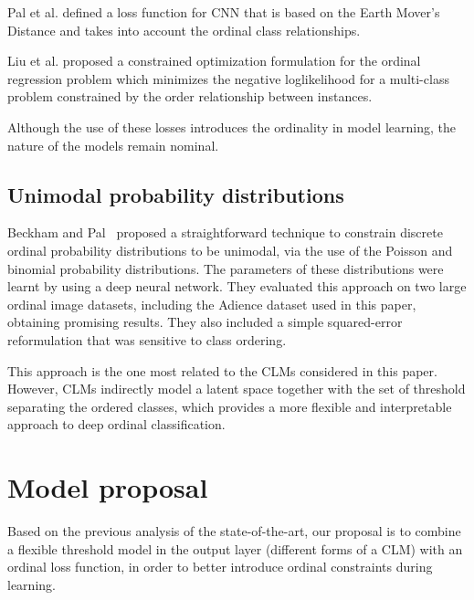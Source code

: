 \documentclass[journal]{IEEEtran}
\begin{document}
	Pal et al. \cite{pal2018severity} defined a loss function for CNN that is based on the Earth Mover's Distance and takes into account the ordinal class relationships.
	
	Liu et al. \cite{liu2018constrained} proposed a constrained optimization formulation for the ordinal regression problem which minimizes the negative loglikelihood for a multi-class problem constrained by the order relationship between instances.	
	
	Although the use of these losses introduces the ordinality in model learning, the nature of the models remain nominal.
	
	
	\subsection{Unimodal probability distributions}

	Beckham and Pal~\cite{beckham2017unimodal} proposed a straightforward technique to constrain discrete ordinal probability distributions to be unimodal, via the use of the Poisson and binomial probability distributions. The parameters of these distributions were learnt by using a deep neural network. They evaluated this approach on two large ordinal image datasets, including the Adience dataset used in this paper, obtaining promising results. They also included a simple squared-error reformulation \cite{beckham2016simple} that was sensitive to class ordering.
	
	This approach is the one most related to the CLMs considered in this paper. However, CLMs indirectly model a latent space together with the set of threshold separating the ordered classes, which provides a more flexible and interpretable approach to deep ordinal classification.	
	
	\section{Model proposal}
	\label{sect:modelProposal}
	
	Based on the previous analysis of the state-of-the-art, our proposal is to combine a flexible threshold model in the output layer (different forms of a CLM) with an ordinal loss function, in order to better introduce ordinal constraints during learning.
	
\end{document}
